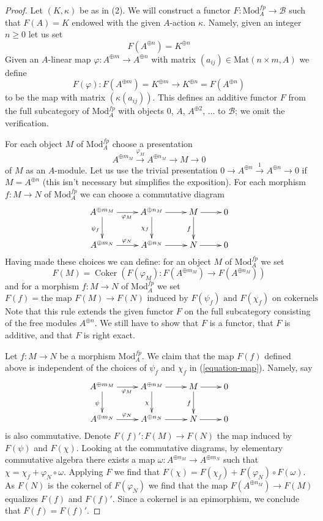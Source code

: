 \documentclass{stacks-project}
\theoremstyle{plain}
\theoremstyle{definition}
\theoremstyle{remark}
\numberwithin{equation}{subsection}
\def\Coker{\mathop{\mathrm{Coker}}}
\begin{document}
\begin{proof}
Let $(K, \kappa)$ be as in (2). We will construct a functor
$F : \text{Mod}^{fp}_A \to \mathcal{B}$ such that $F(A) = K$
endowed with the given $A$-action $\kappa$. Namely, given an
integer $n \geq 0$ let us set
$$
F(A^{\oplus n}) = K^{\oplus n}
$$
Given an $A$-linear map $\varphi : A^{\oplus m} \to A^{\oplus n}$
with matrix $(a_{ij}) \in \text{Mat}(n \times m, A)$ we define
$$
F(\varphi) :
F(A^{\oplus m}) = K^{\oplus m}
\longrightarrow
K^{\oplus n} = F(A^{\oplus n})
$$
to be the map with matrix $(\kappa(a_{ij}))$. This defines an additive
functor $F$ from the full subcategory of
$\text{Mod}^{fp}_A$ with objects $0$, $A$, $A^{\oplus 2}$, $\ldots$
to $\mathcal{B}$; we omit the verification.

\medskip\noindent
For each object $M$ of $\text{Mod}^{fp}_A$ choose a presentation
$$
A^{\oplus m_M} \xrightarrow{\varphi_M} A^{\oplus n_M} \to M \to 0
$$
of $M$ as an $A$-module. Let us use the trivial presentation
$0 \to A^{\oplus n} \xrightarrow{1} A^{\oplus n} \to 0$ if $M = A^{\oplus n}$
(this isn't necessary but simplifies the exposition).
For each morphism $f : M \to N$ of
$\text{Mod}^{fp}_A$ we can choose a commutative diagram
\begin{equation}
\label{equation-map}
\vcenter{
\xymatrix{
A^{\oplus m_M} \ar[r]_{\varphi_M} \ar[d]_{\psi_f} &
A^{\oplus n_M} \ar[r] \ar[d]_{\chi_f} &
M \ar[r] \ar[d]_f & 0 \\
A^{\oplus m_N} \ar[r]^{\varphi_N} &
A^{\oplus n_N} \ar[r] &
N \ar[r] & 0
}
}
\end{equation}
Having made these choices we can define: for an object
$M$ of $\text{Mod}^{fp}_A$ we set
$$
F(M) = \Coker(F(\varphi_M) : F(A^{\oplus m_M}) \to F(A^{\oplus n_M}))
$$
and for a morphism $f : M \to N$ of $\text{Mod}^{fp}_A$ we set
$$
F(f) = \text{the map }F(M) \to F(N)\text{ induced by }
F(\psi_f)\text{ and }F(\chi_f)\text{ on cokernels}
$$
Note that this rule extends the given functor $F$ on
the full subcategory consisting of the free modules $A^{\oplus n}$.
We still have to show that $F$ is a functor, that $F$ is additive,
and that $F$ is right exact.

\medskip\noindent
Let $f : M \to N$ be a morphism $\text{Mod}^{fp}_A$. We claim that the map
$F(f)$ defined above is independent of the choices of $\psi_f$ and $\chi_f$
in (\ref{equation-map}). Namely, say
$$
\xymatrix{
A^{\oplus m_M} \ar[r]_{\varphi_M} \ar[d]_\psi &
A^{\oplus n_M} \ar[r] \ar[d]_\chi &
M \ar[r] \ar[d]_f & 0 \\
A^{\oplus m_N} \ar[r]^{\varphi_N} &
A^{\oplus n_N} \ar[r] &
N \ar[r] & 0
}
$$
is also commutative. Denote $F(f)' : F(M) \to F(N)$ the map
induced by $F(\psi)$ and $F(\chi)$. Looking at the commutative
diagrams, by elementary commutative algebra there exists a map
$\omega : A^{\oplus n_M} \to A^{\oplus m_N}$ such that
$\chi = \chi_f + \varphi_N \circ \omega$. Applying $F$ we
find that $F(\chi) = F(\chi_f) + F(\varphi_N) \circ F(\omega)$.
As $F(N)$ is the cokernel of $F(\varphi_N)$ we find
that the map $F(A^{\oplus n_M}) \to F(M)$ equalizes $F(f)$ and $F(f)'$.
Since a cokernel is an epimorphism, we conclude that $F(f) = F(f)'$.


\end{proof}
\end{document}

